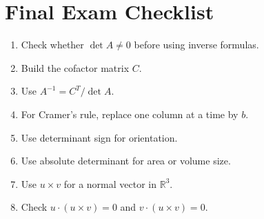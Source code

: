\documentclass[10pt]{article}
\begin{document}
\section{Final Exam Checklist}

\begin{enumerate}
  \item Check whether \(\det A\ne0\) before using inverse formulas.
  \item Build the cofactor matrix \(C\).
  \item Use \(A^{-1}=C^{T}/\det A\).
  \item For Cramer's rule, replace one column at a time by \(b\).
  \item Use determinant sign for orientation.
  \item Use absolute determinant for area or volume size.
  \item Use \(u\times v\) for a normal vector in \(\mathbb{R}^3\).
  \item Check \(u\cdot(u\times v)=0\) and \(v\cdot(u\times v)=0\).
\end{enumerate}
\end{document}
